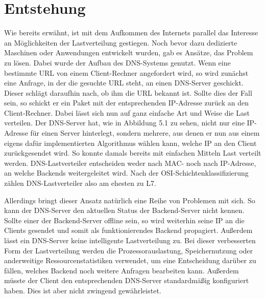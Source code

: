 \section{Entstehung}

Wie bereits erwähnt, ist mit dem Aufkommen des Internets parallel das Interesse an Möglichkeiten der Lastverteilung gestiegen. Noch bevor dazu dedizierte Maschinen oder Anwendungen entwickelt wurden, gab es Ansätze, das Problem zu lösen. Dabei wurde der Aufbau des DNS-Systems genutzt. Wenn eine bestimmte URL von einem Client-Rechner angefordert wird, so wird zunächst eine Anfrage, in der die gesuchte URL steht, an einen DNS-Server geschickt. Dieser schlägt daraufhin nach, ob ihm die URL bekannt ist. Sollte dies der Fall sein, so schickt er ein Paket mit der entsprechenden IP-Adresse zurück an den Client-Rechner. \cite{hong2006dns} Dabei lässt sich nun auf ganz einfache Art und Weise die Last verteilen. Der DNS-Server hat, wie in Abbildung 5.1 zu sehen, nicht nur eine IP-Adresse für einen Server hinterlegt, sondern mehrere, aus denen er nun aus einem eigens dafür implementierten Algorithmus wählen kann, welche IP an den Client zurückgesendet wird. So konnte damals bereits mit einfachen Mitteln Last verteilt werden. DNS-Lastverteiler entscheiden weder nach MAC- noch nach IP-Adresse, an welche Backends weitergeleitet wird. Nach der OSI-Schichtenklassifizierung zählen DNS-Lastverteiler also am ehesten zu L7. 

Allerdings bringt dieser Ansatz natürlich eine Reihe von Problemen mit sich. So kann der DNS-Server den aktuellen Status der Backend-Server nicht kennen. Sollte einer der Backend-Server offline sein, so wird weiterhin seine IP an die Clients gesendet und somit als funktionierendes Backend propagiert. Außerdem lässt ein DNS-Server keine intelligente Lastverteilung zu. Bei dieser verbesserten Form der Lastverteilung werden die Prozessorauslastung, Speichernutzung oder anderweitige Ressourcenstatistiken verwendet, um eine Entscheidung darüber zu fällen, welches Backend noch weitere Anfragen bearbeiten kann. Außerdem müsste der Client den entsprechenden DNS-Server standardmäßig konfiguriert haben. Dies ist aber nicht zwingend gewährleistet.

